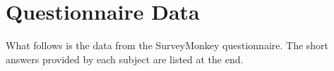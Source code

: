 \documentclass[12pt, letterpaper]{report}
\begin{document}
\section*{Questionnaire Data}
What follows is the data from the SurveyMonkey questionnaire. The short answers provided by each subject are listed at the end.\\

\end{document}
